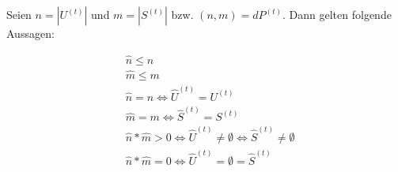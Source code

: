 \begin{Theorem}

Seien $n = |U^{(t)}|$ und $m = |S^{(t)}|$ bzw. $(n, m) = dP^{(t)}$. Dann gelten folgende Aussagen:

\begin{align}
&\widehat{n} \leq n \tag{i.u} \\ 
&\widehat{m} \leq m \tag{i.s} \\
&\widehat{n} = n \Leftrightarrow \widehat{U}^{(t)} = U^{(t)} \tag{ii.u} \\
&\widehat{m} = m \Leftrightarrow \widehat{S}^{(t)} = S^{(t)} \tag{ii.s} \\
&\widehat{n} * \widehat{m} > 0 \Leftrightarrow \widehat{U}^{(t)} \neq \emptyset \Leftrightarrow \widehat{S}^{(t)} \neq \emptyset \tag{iii} \\
&\widehat{n} * \widehat{m} = 0 \Leftrightarrow \widehat{U}^{(t)} = \emptyset = \widehat{S}^{(t)} \tag{iv}
\end{align}

\end{Theorem}

\vspace{0.3cm}

